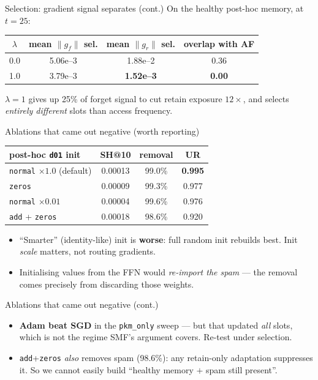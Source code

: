 \documentclass{beamer}
\newcommand{\gf}{\ensuremath{g_f}}
\newcommand{\gr}{\ensuremath{g_r}}
\begin{document}
\begin{frame}{Selection: gradient signal separates (cont.)}
On the healthy post-hoc memory, at $t=25$:
\begin{center}
\begin{tabular}{|c|c|c|c|}
\hline
$\lambda$ & mean $\|\gf\|$ sel. & mean $\|\gr\|$ sel. & overlap with AF \\
\hline
0.0 & 5.06e--3 & 1.88e--2 & 0.36 \\
1.0 & 3.79e--3 & \textbf{1.52e--3} & \textbf{0.00} \\
\hline
\end{tabular}
\end{center}

$\lambda{=}1$ gives up 25\% of forget signal to cut retain exposure
$12\times$, and selects \emph{entirely different} slots than access frequency.
\end{frame}

\begin{frame}{Ablations that came out negative (worth reporting)}
\begin{center}
\begin{tabular}{|l|c|c|c|}
\hline
post-hoc \texttt{d01} init & SH@10 & removal & UR \\
\hline
\texttt{normal} $\times 1.0$ (default) & 0.00013 & 99.0\% & \textbf{0.995} \\
\texttt{zeros}                          & 0.00009 & 99.3\% & 0.977 \\
\texttt{normal} $\times 0.01$           & 0.00004 & 99.6\% & 0.976 \\
\texttt{add} + \texttt{zeros}           & 0.00018 & 98.6\% & 0.920 \\
\hline
\end{tabular}
\end{center}

\begin{itemize}
  \item ``Smarter'' (identity-like) init is \textbf{worse}: full random init
        rebuilds best. Init \emph{scale} matters, not routing gradients.
  \item Initialising values from the FFN would \emph{re-import the spam} ---
        the removal comes precisely from discarding those weights.
\end{itemize}
\end{frame}

\begin{frame}{Ablations that came out negative (cont.)}
\begin{itemize}
  \item \textbf{Adam beat SGD} in the \texttt{pkm\_only} sweep --- but that
        updated \emph{all} slots, which is not the regime SMF's argument covers.
        Re-test under selection.
  \item \texttt{add}+\texttt{zeros} \emph{also} removes spam (98.6\%): any
        retain-only adaptation suppresses it. \alert{So we cannot easily build
        ``healthy memory $+$ spam still present''.}
\end{itemize}
\end{frame}
\end{document}
